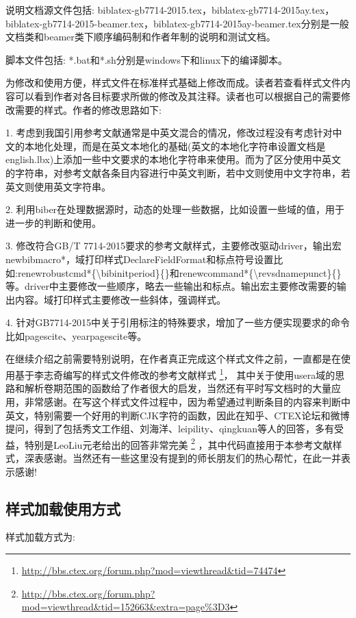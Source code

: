 说明文档源文件包括:
biblatex-gb7714-2015.tex，biblatex-gb7714-2015ay.tex，biblatex-gb7714-2015-beamer.tex，biblatex-gb7714-2015ay-beamer.tex分别是一般文档类和beamer类下顺序编码制和作者年制的说明和测试文档。

脚本文件包括:
*.bat和*.sh分别是windows下和linux下的编译脚本。

为修改和使用方便，样式文件在标准样式基础上修改而成。读者若查看样式文件内容可以看到作者对各目标要求所做的修改及其注释。读者也可以根据自己的需要修改需要的样式。作者的修改思路如下:

1. 考虑到我国引用参考文献通常是中英文混合的情况，修改过程没有考虑针对中文的本地化处理，而是在英文本地化的基础(英文的本地化字符串设置文档是english.lbx)上添加一些中文要求的本地化字符串来使用。而为了区分使用中英文的字符串，对参考文献各条目内容进行中英文判断，若中文则使用中文字符串，若英文则使用英文字符串。

2. 利用biber在处理数据源时，动态的处理一些数据，比如设置一些域的值，用于进一步的判断和使用。

3. 修改符合GB/T 7714-2015要求的参考文献样式，主要修改驱动driver，输出宏newbibmacro*，域打印样式DeclareFieldFormat和标点符号设置比如:renewrobustcmd*\{\textbackslash bibinitperiod\}\{\}和renewcommand*\{\textbackslash revsdnamepunct\}\{\} 等。driver中主要修改一些顺序，略去一些输出和标点。输出宏主要修改需要的输出内容。域打印样式主要修改一些斜体，强调样式。

4. 针对GB7714-2015中关于引用标注的特殊要求，增加了一些方便实现要求的命令比如pagescite、yearpagescite等。

在继续介绍之前需要特别说明，在作者真正完成这个样式文件之前，一直都是在使用基于李志奇编写的样式文件修改的参考文献样式
\footnote{\url{http://bbs.ctex.org/forum.php?mod=viewthread&tid=74474}}，
其中关于使用usera域的思路和解析卷期范围的函数给了作者很大的启发，当然还有平时写文档时的大量应用，非常感谢。在写这个样式文件过程中，因为希望通过判断条目的内容来判断中英文，特别需要一个好用的判断CJK字符的函数，因此在知乎、CTEX论坛和微博提问，得到了包括秀文工作组、刘海洋、leipility、qingkuan等人的回答，多有受益，特别是LeoLiu元老给出的回答非常完美
\footnote{\url{http://bbs.ctex.org/forum.php?mod=viewthread&tid=152663&extra=page\%3D3}}
，其中代码直接用于本参考文献样式，深表感谢。当然还有一些这里没有提到的师长朋友们的热心帮忙，在此一并表示感谢!

\subsection{样式加载使用方式}
样式加载方式为:

